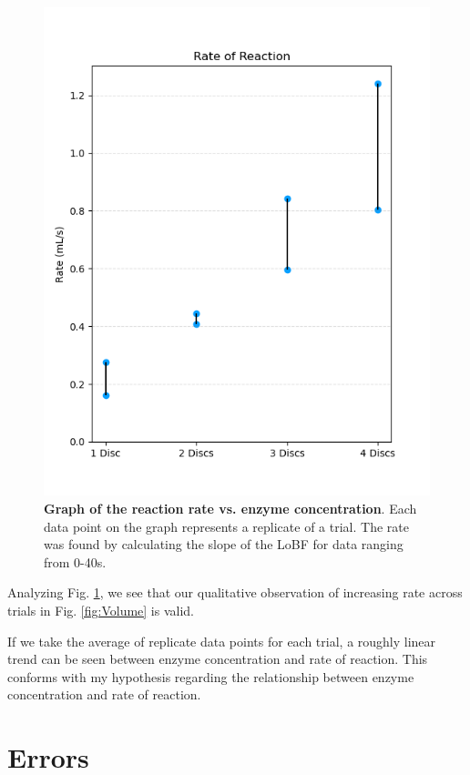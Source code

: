 \documentclass[prl,twocolumn,amsmath,amssymb,superscriptaddress]{revtex4-2}
\begin{document}
\begin{figure}[htb]
    \includegraphics[width=1\linewidth]{Rate.png}
    \caption{\textbf{Graph of the reaction rate vs. enzyme concentration}. Each data point on the graph represents a replicate of a trial. The rate was found by calculating the slope of the LoBF for data ranging from 0-40s.}
    \label{fig:Rate}
\end{figure}

\newpage
Analyzing Fig. \ref{fig:Rate}, we see that our qualitative observation of increasing rate across trials in Fig. \ref{fig:Volume} is valid. 

If we  take the average of replicate data points for each trial, a roughly linear trend can be seen between enzyme concentration and rate of reaction. This conforms with my hypothesis regarding the relationship between enzyme concentration and rate of reaction.

\newpage
\section{Errors}
\end{document}
